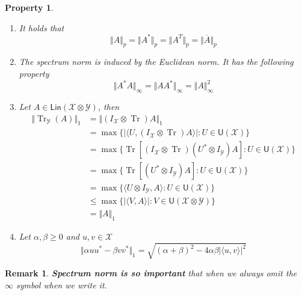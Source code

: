 \documentclass[aps,pra,onecolumn,notitlepage,superscriptaddress]{revtex4-1}
\newcommand{\spc}[1]{\mathcal{#1}}
\newcommand{\Lin}{\mathsf{Lin}}
\newcommand{\U}{\mathsf{U}}
\def\>{\rangle}
\def\<{\langle}
\newcommand{\Tr}{\operatorname{Tr}}
\newtheorem{rem}{Remark}
\newtheorem{proper}{Property}
\begin{document}
\begin{proper}
\begin{enumerate}
            \item It holds that
            \begin{equation}
                \Vert A \Vert_p = \Vert A^* \Vert_p = \Vert A^T \Vert_p = \Vert \overline{A} \Vert_p
            \end{equation}

            \item The spectrum norm is induced by the Euclidean norm. It has the following property
            \begin{equation}
                \Vert A^*A \Vert_{\infty} = \Vert AA^* \Vert_{\infty} = \Vert A \Vert_{\infty}^2
            \end{equation}

            \item Let $A \in \Lin(\spc X \otimes \spc Y)$, then 
            \begin{align*}
                \Vert \Tr_{\spc Y}(A) \Vert_1 
                &= \Vert (I_{\spc X} \otimes \Tr)A \Vert_1 \\
                &= \max\{ |\< U,(I_{\spc X} \otimes \Tr)A \>| : U \in \U(\spc X) \} \\
                &= \max\{ \Tr[(I_{\spc X} \otimes \Tr)(U^* \otimes I_{\spc Y})A] : U \in \U(\spc X) \} \\
                &= \max\{ \Tr[(U^* \otimes I_{\spc Y})A] : U \in \U(\spc X) \} \\
                &= \max\{ \<U \otimes I_{\spc Y}, A\> : U \in \U(\spc X) \} \\
                &\leq \max\{ |\< V,A \>| : V \in \U(\spc X \otimes \spc Y) \} \\
                &= \Vert A \Vert_1
            \end{align*}
            
            \item Let $\alpha, \beta \geq 0$ and $u, v \in \spc X$
            \begin{equation}
                \Vert \alpha uu^* - \beta vv^* \Vert_1 = \sqrt{(\alpha+\beta)^2 - 4 \alpha \beta |\< u,v \>|^2 }
            \end{equation}
        \end{enumerate}
    \end{proper}

    \begin{rem}
        \textbf{Spectrum norm is so important} that when we always omit the $\infty$ symbol when we write it.
    \end{rem}
\end{document}
